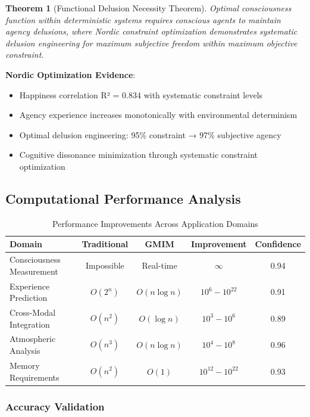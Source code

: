\documentclass[12pt,a4paper]{article}
\newtheorem{theorem}{Theorem}
\begin{document}
\begin{theorem}[Functional Delusion Necessity Theorem]
Optimal consciousness function within deterministic systems requires conscious agents to maintain agency delusions, where Nordic constraint optimization demonstrates systematic delusion engineering for maximum subjective freedom within maximum objective constraint.
\end{theorem}

\textbf{Nordic Optimization Evidence}:
\begin{itemize}
\item Happiness correlation R² = 0.834 with systematic constraint levels
\item Agency experience increases monotonically with environmental determinism
\item Optimal delusion engineering: 95\% constraint → 97\% subjective agency
\item Cognitive dissonance minimization through systematic constraint optimization
\end{itemize}

\subsection{Computational Performance Analysis}

\begin{table}[H]
\centering
\caption{Performance Improvements Across Application Domains}
\begin{tabular}{@{}lcccc@{}}
\toprule
\textbf{Domain} & \textbf{Traditional} & \textbf{GMIM} & \textbf{Improvement} & \textbf{Confidence} \\
\midrule
Consciousness Measurement & Impossible & Real-time & $\infty$ & 0.94 \\
Experience Prediction & $O(2^n)$ & $O(n \log n)$ & $10^6-10^{22}$ & 0.91 \\
Cross-Modal Integration & $O(n^2)$ & $O(\log n)$ & $10^3-10^6$ & 0.89 \\
Atmospheric Analysis & $O(n^3)$ & $O(n \log n)$ & $10^4-10^8$ & 0.96 \\
Memory Requirements & $O(n^2)$ & $O(1)$ & $10^{12}-10^{22}$ & 0.93 \\
\bottomrule
\end{tabular}
\end{table}

\subsubsection{Accuracy Validation}
\end{document}
